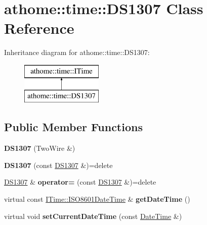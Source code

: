 \hypertarget{classathome_1_1time_1_1_d_s1307}{}\section{athome\+:\+:time\+:\+:D\+S1307 Class Reference}
\label{classathome_1_1time_1_1_d_s1307}
Inheritance diagram for athome\+:\+:time\+:\+:D\+S1307\+:\begin{figure}[H]
\begin{center}
\leavevmode
\includegraphics[height=2.000000cm]{classathome_1_1time_1_1_d_s1307}
\end{center}
\end{figure}
\subsection*{Public Member Functions}
\begin{DoxyCompactItemize}
\item 
\mbox{\label{classathome_1_1time_1_1_d_s1307_ac9894245cf5bef539272e6ed6c5ed237}} 
{\bfseries D\+S1307} (Two\+Wire \&)
\item 
\mbox{\label{classathome_1_1time_1_1_d_s1307_a28a802496d0d76cac3232720c0a1243e}} 
{\bfseries D\+S1307} (const \mbox{\hyperlink{classathome_1_1time_1_1_d_s1307}{D\+S1307}} \&)=delete
\item 
\mbox{\label{classathome_1_1time_1_1_d_s1307_a6aabfb829a3ac526526348d22180e09c}} 
\mbox{\hyperlink{classathome_1_1time_1_1_d_s1307}{D\+S1307}} \& {\bfseries operator=} (const \mbox{\hyperlink{classathome_1_1time_1_1_d_s1307}{D\+S1307}} \&)=delete
\item 
\mbox{\label{classathome_1_1time_1_1_d_s1307_aa9c452a50a12e67f92346ce3f770d283}} 
virtual const \mbox{\hyperlink{structathome_1_1time_1_1_i_time_1_1_i_s_o8601_date_time}{I\+Time\+::\+I\+S\+O8601\+Date\+Time}} \& {\bfseries get\+Date\+Time} ()
\item 
\mbox{\label{classathome_1_1time_1_1_d_s1307_a595285f3bf325d2208c6d48b686c5b86}} 
virtual void {\bfseries set\+Current\+Date\+Time} (const \mbox{\hyperlink{classathome_1_1time_1_1_i_time_1_1_date_time}{Date\+Time}} \&)
\end{DoxyCompactItemize}

